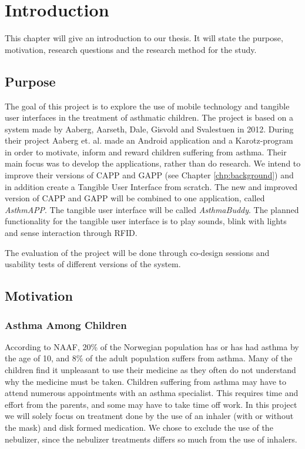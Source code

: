 \chapter{Introduction}
\label{chp:introduction}

This chapter will give an introduction to our thesis. It will state the purpose, motivation, research questions and the research method for the study. 

\section{Purpose}
\label{sec:purpose}
The goal of this project is to explore the use of mobile technology and tangible user interfaces in the treatment of asthmatic children. The project is based on a system made by Aaberg, Aarseth, Dale, Gisvold and Svalestuen in 2012\cite{CustomerDriven}. During their project Aaberg et. al. made an Android application and a Karotz-program in order to motivate, inform and reward children suffering from asthma. Their main focus was to develop the applications, rather than do research.
We intend to improve their versions of CAPP and GAPP (see Chapter \ref{chp:background}) and in addition create a Tangible User Interface from scratch. The new and improved version of CAPP and GAPP will be combined to one application, called \emph{AsthmAPP}. The tangible user interface will be called \emph{AsthmaBuddy}. The planned functionality for the tangible user interface is to play sounds, blink with lights and sense interaction through RFID. 

The evaluation of the project will be done through co-design sessions and usability tests of different versions of the system. 
 

\section{Motivation}
\label{sec:motivation}
\subsection{Asthma Among Children}
According to NAAF, 20\% of the Norwegian population has or has had asthma by the age of 10, and 8\% of the adult population suffers from asthma\cite{NAAFStat}. Many of the children find it unpleasant to use their medicine as they often do not understand why the medicine must be taken. Children suffering from asthma may have to attend numerous appointments with an asthma specialist. This requires time and effort from the parents, and some may have to take time off work. In this project we will solely focus on treatment done by the use of an inhaler (with or without the mask) and disk formed medication. We chose to exclude the use of the nebulizer, since the nebulizer treatments differs so much from the use of inhalers.

